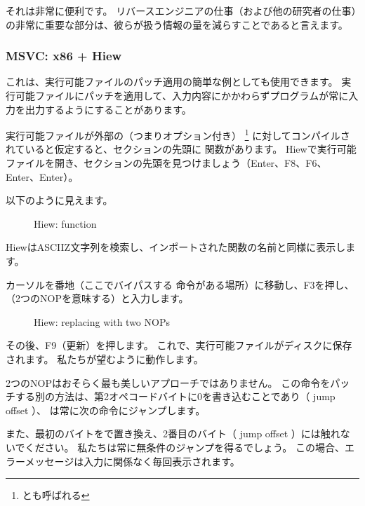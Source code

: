 それは非常に便利です。
リバースエンジニアの仕事（および他の研究者の仕事）の非常に重要な部分は、彼らが扱う情報の量を減らすことであると言えます。



\clearpage
\subsubsection{MSVC: x86 + Hiew}

これは、実行可能ファイルのパッチ適用の簡単な例としても使用できます。 
実行可能ファイルにパッチを適用して、入力内容にかかわらずプログラムが常に入力を出力するようにすることがあります。

実行可能ファイルが外部の（つまりオプション付き）
\footnote{とも呼ばれる}
に対してコンパイルされていると仮定すると、セクションの先頭に \main 関数があります。 
Hiewで実行可能ファイルを開き、セクションの先頭を見つけましょう（Enter、F8、F6、Enter、Enter）。 

以下のように見えます。

\begin{figure}[H]
\centering
{}
\caption{Hiew: \main function}
\label{fig:scanf_ex3_hiew_1}
\end{figure}

Hiewは\ac{ASCIIZ}文字列を検索し、インポートされた関数の名前と同様に表示します。

\clearpage
カーソルを番地（ここでバイパスする \JNZ 命令がある場所）に移動し、F3を押し、（2つの\ac{NOP}を意味する）と入力します。

\begin{figure}[H]
\centering
{}
\caption{Hiew: replacing  with two \ac{NOP}s}
\label{fig:scanf_ex3_hiew_2}
\end{figure}

その後、F9（更新）を押します。 これで、実行可能ファイルがディスクに保存されます。 私たちが望むように動作します。

2つの\ac{NOP}はおそらく最も美しいアプローチではありません。 
この命令をパッチする別の方法は、第2オペコードバイトに0を書き込むことであり（ \gls{jump offset} ）、 
\JNZ は常に次の命令にジャンプします。

また、最初のバイトをで置き換え、2番目のバイト（ \gls{jump offset} ）には触れないでください。 
私たちは常に無条件のジャンプを得るでしょう。 
この場合、エラーメッセージは入力に関係なく毎回表示されます。
